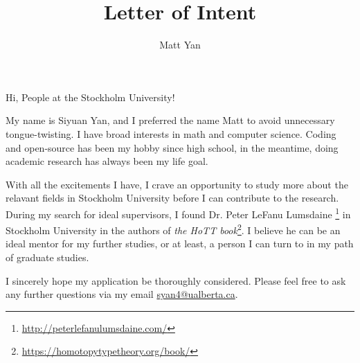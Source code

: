 \documentclass[11pt]{article}
\title{Letter of Intent}
\author{Matt Yan}
\begin{document}
    \maketitle

    Hi, People at the Stockholm University!

    My name is Siyuan Yan,
    and I preferred the name Matt to avoid unnecessary tongue-twisting.
    I have broad interests in math and computer science.
    Coding and open-source has been my hobby since high school,
    in the meantime, doing academic research has always been my life goal.

    

    

    With all the excitements I have,
    I crave an opportunity to study more about the relavant fields
    in Stockholm University before I can contribute to the research.
    During my search for ideal supervisors,
    I found Dr. Peter LeFanu Lumsdaine \footnote{\url{http://peterlefanulumsdaine.com/}} in Stockholm University in the
    authors of \textit{the HoTT book}\footnote{\url{https://homotopytypetheory.org/book/}}.
    I believe he can be an ideal mentor for my further studies,
    or at least, a person I can turn to in my path of graduate studies.

    I sincerely hope my application be thoroughly considered.
    Please feel free to ask any further questions via my email \href{mailto:syan4@ualberta.ca}{syan4@ualberta.ca}.
\end{document}
